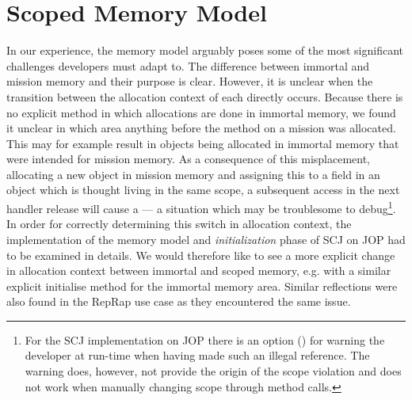 \section{Scoped Memory Model} %
 \label{sec:scoped_memory_model}
In our experience, the memory model arguably poses some of the most significant challenges developers must adapt to. The difference between immortal and mission memory and their purpose is clear. However, it is unclear when the transition between the allocation context of each directly occurs. Because there is no explicit method in which allocations are done in immortal memory, we found it unclear in which area anything before the  method on a mission was allocated. This may for example result in objects being allocated in immortal memory that were intended for mission memory. As a consequence of this misplacement, allocating a new object in mission memory and assigning this to a field in an object which is thought living in the same scope, a subsequent access in the next handler release will cause a \mbox{} --- a situation which may be troublesome to debug\footnote{For the SCJ implementation on JOP there is an option (\mbox{}) for warning the developer at run-time when having made such an illegal reference. The warning does, however, not provide the origin of the scope violation and does not work when manually changing scope through method calls.}. In order for correctly determining this switch in allocation context, the implementation of the memory model and \textit{initialization} phase of SCJ on JOP had to be examined in details. We would therefore like to see a more explicit change in allocation context between immortal and scoped memory, e.g. with a similar explicit initialise method for the immortal memory area. Similar reflections were also found in the RepRap use case\cite{Schoeberl:2012:RepRap} as they encountered the same issue.

